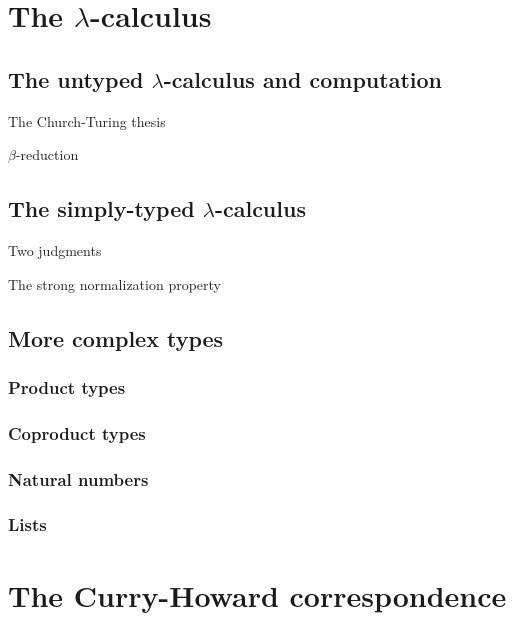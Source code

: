 \documentclass[12pt,twoside,draft]{reedthesis}
\begin{document}
\section{The $\lambda$-calculus}
\label{sec:the-lambda-calculus}

\subsection{The untyped $\lambda$-calculus and computation}
\label{subsec:the-untyped-lambda-calculus}

The Church-Turing thesis

$\beta$-reduction

\subsection{The simply-typed $\lambda$-calculus}
\label{subsec:the-simply-typed-lambda-calculus}

Two judgments

The strong normalization property

\subsection{More complex types}
\label{subsec:more-complex-types}

\subsubsection{Product types}
\label{subsubsec:product-types}

\subsubsection{Coproduct types}
\label{subsubsec:coproduct-types}

\subsubsection{Natural numbers}
\label{subsubsec:natural-numbers}

\subsubsection{Lists}
\label{subsubsec:lists}

\section{The Curry-Howard correspondence}
\label{sec:the-curry-howard-correspondence}
\end{document}
